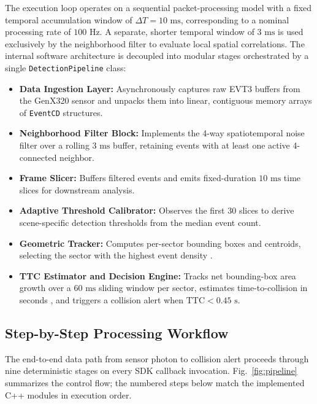 \documentclass[conference]{IEEEtran}
\begin{document}
The execution loop operates on a sequential packet-processing model with a fixed temporal accumulation window of $\Delta T = 10\text{ ms}$, corresponding to a nominal processing rate of $100\text{ Hz}$. A separate, shorter temporal window of $3\text{ ms}$ is used exclusively by the neighborhood filter to evaluate local spatial correlations. The internal software architecture is decoupled into modular stages orchestrated by a single \texttt{DetectionPipeline} class:
\begin{itemize}
    \item \textbf{Data Ingestion Layer:} Asynchronously captures raw EVT3 buffers from the GenX320 sensor and unpacks them into linear, contiguous memory arrays of \texttt{EventCD} structures.
    \item \textbf{Neighborhood Filter Block:} Implements the 4-way spatiotemporal noise filter \cite{b15} over a rolling $3\text{ ms}$ buffer, retaining events with at least one active 4-connected neighbor.
    \item \textbf{Frame Slicer:} Buffers filtered events and emits fixed-duration $10\text{ ms}$ time slices for downstream analysis.
    \item \textbf{Adaptive Threshold Calibrator:} Observes the first $30$ slices to derive scene-specific detection thresholds from the median event count.
    \item \textbf{Geometric Tracker:} Computes per-sector bounding boxes and centroids, selecting the sector with the highest event density \cite{b14}.
    \item \textbf{TTC Estimator and Decision Engine:} Tracks net bounding-box area growth over a $60\text{ ms}$ sliding window per sector, estimates time-to-collision in seconds \cite{b13}, and triggers a collision alert when $\text{TTC} < 0.45\text{ s}$.
\end{itemize}

\subsection{Step-by-Step Processing Workflow}
The end-to-end data path from sensor photon to collision alert proceeds through nine deterministic stages on every SDK callback invocation. Fig.~\ref{fig:pipeline} summarizes the control flow; the numbered steps below match the implemented C++ modules in execution order.
\end{document}
